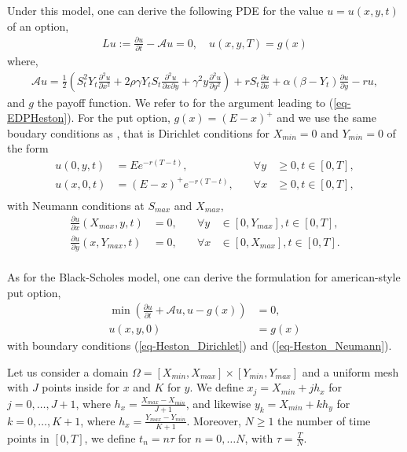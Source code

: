 \documentclass[12pt,a4paper]{article}
\newcommand{\pd}[2]{\frac{\partial {#1}}{\partial {#2}}}
\newcommand{\pdd}[2]{\frac{\partial^2 {#1}}{\partial {#2}^2}}
\newcommand{\pdc}[3]{\frac{\partial^2 {#1}}{\partial {#2} \partial {#3}}}
\begin{document}
Under this model, one can derive the following PDE for the value $u=u(x,y,t)$ of an option,
\begin{align}
	Lu := \pd{u}{t} - \mathcal{A}u = 0, \quad u(x,y,T) = g(x)\label{eq-EDPHeston}
\end{align}
where,
\begin{align}
	\mathcal{A}u = \frac{1}{2} \left( S_t^2 Y_t \pdd{u}{x} + 2 \rho \gamma Y_t S_t \pdc{u}{x}{y}+ \gamma^2 y \pdd{u}{y} \right) + r S_t \pd{u}{x} + \alpha (\beta - Y_t) \pd{u}{y} - ru, \label{eq-A_Heston}
\end{align}
and $g$ the payoff function.
We refer to \cite{Oosterlee,MR1628686} for the argument leading to (\ref{eq-EDPHeston}). For the put option, $g(x) = (E-x)^+$ and we use the same boudary conditions as \cite{Oosterlee}, that is Dirichlet conditions for $X_{min}=0$ and $Y_{min}=0$ of the form
\begin{equation}\label{eq-Heston_Dirichlet}
\begin{aligned}
	u(0, y, t) &= E e^{-r(T-t)}, \quad &\forall y &\geq 0, t \in [0,T], \\
	u(x, 0, t) &= (E-x)^+ e^{-r(T-t)}, \quad &\forall x &\geq 0, t \in [0,T], \\	
\end{aligned}
\end{equation}
with Neumann conditions at $S_{max}$ and $X_{max}$,
\begin{equation}\label{eq-Heston_Neumann}
\begin{aligned}
	\pd{u}{x}(X_{max}, y, t) &= 0, \quad &\forall y &\in [0,Y_{max}], t \in [0,T], \\
	\pd{u}{y}(x, Y_{max}, t) &= 0, \quad &\forall x &\in [0,X_{max}], t \in [0,T]. \\	
\end{aligned}
\end{equation}

As for the Black-Scholes model, one can derive the formulation for american-style put option,
\begin{equation} \label{eq-HestonObstacle}
\begin{aligned}
	\min \left( \pd{u}{t} + \mathcal{A}u, u - g(x) \right) &= 0, \\
	u(x, y, 0) &= g(x)
\end{aligned}
\end{equation}
with boundary conditions (\ref{eq-Heston_Dirichlet}) and (\ref{eq-Heston_Neumann}).

Let us consider a domain $\Omega = [X_{min}, X_{max}] \times [Y_{min}, Y_{max}]$ and a uniform mesh with $J$ points inside for $x$ and $K$ for $y$. We define $x_j = X_{min} + jh_x$ for $j = 0, \dots, J+1$, where $h_x = \frac{X_{max} - X_{min}}{J+1}$, and likewise $y_k = X_{min} + kh_y$ for $k = 0, \dots, K+1$, where $h_x = \frac{Y_{max} - Y_{min}}{K+1}$. Moreover, $N \geq 1$ the number of time points in $[0,T]$, we define $t_n = n \tau$ for $n = 0, \dots N$, with $\tau = \frac{T}{N}$.
\end{document}
